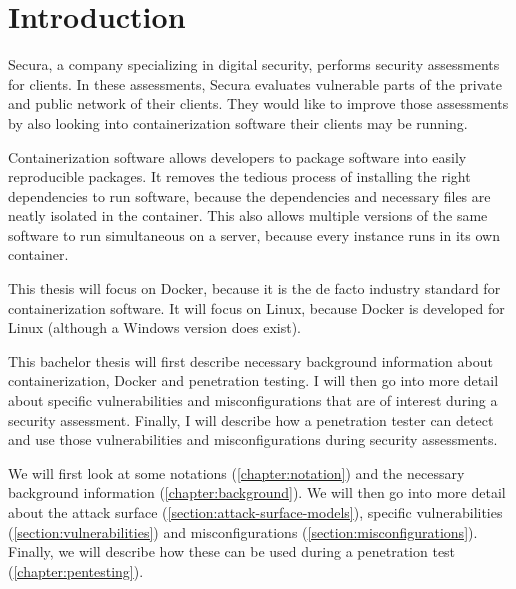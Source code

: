 \chapter{Introduction}
Secura, a company specializing in digital security, performs security assessments for clients. In these assessments, Secura evaluates vulnerable parts of the private and public network of their clients. They would like to improve those assessments by also looking into containerization software their clients may be running.

\hfill

Containerization software allows developers to package software into easily reproducible packages.
It removes the tedious process of installing the right dependencies to run software, because the dependencies and necessary files are neatly isolated in the container. This also allows multiple versions of the same software to run simultaneous on a server, because every instance runs in its own container.

\hfill

This thesis will focus on Docker, because it is the de facto industry standard for containerization software. It will focus on Linux, because Docker is developed for Linux (although a Windows version does exist).

\hfill

This bachelor thesis will first describe necessary background information about containerization, Docker and penetration testing. I will then go into more detail about specific vulnerabilities and misconfigurations that are of interest during a security assessment. Finally, I will describe how a penetration tester can detect and use those vulnerabilities and misconfigurations during security assessments.

We will first look at some notations (\autoref{chapter:notation}) and the necessary background information (\autoref{chapter:background}). We will then go into more detail about the attack surface (\autoref{section:attack-surface-models}), specific vulnerabilities (\autoref{section:vulnerabilities}) and misconfigurations (\autoref{section:misconfigurations}). Finally, we will describe how these can be used during a penetration test (\autoref{chapter:pentesting}).
